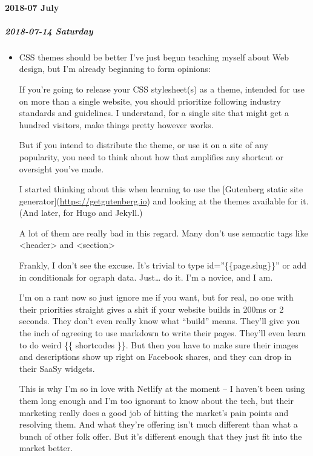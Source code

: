 \documentclass[11pt]{article}
\begin{document}
\paragraph*{2018-07 July}
\label{sec:orgec62116}
\startcontents[level-4]
\subparagraph*{2018-07-14 Saturday}
\label{sec:orgd4bd8c6}
\begin{itemize}
\item CSS themes should be better
\label{sec:orgb2c5ca3}
I’ve just begun teaching myself about Web design, but I’m already beginning to form opinions:

If you’re going to release your CSS stylesheet(s) as a theme, intended for use on more than a single website, you should prioritize following industry standards and guidelines. I understand, for a single site that might get a hundred visitors, make things pretty however works.

But if you intend to distribute the theme, or use it on a site of any popularity, you need to think about how that amplifies any shortcut or oversight you’ve made.

I started thinking about this when learning to use the [Gutenberg static site generator](\url{https://getgutenberg.io}) and looking at the themes available for it. (And later, for Hugo and Jekyll.)

A lot of them are really bad in this regard. Many don’t use semantic tags like <header> and <section>

Frankly, I don’t see the excuse. It’s trivial to type id=”\{\{page.slug\}\}” or add in conditionals for ograph data. Just… do it. I’m a novice, and I am.

I’m on a rant now so just ignore me if you want, but for real, no one with their priorities straight gives a shit if your website builds in 200ms or 2 seconds. They don’t even really know what “build” means. They’ll give you the inch of agreeing to use markdown to write their pages. They’ll even learn to do weird \{\{ shortcodes \}\}. But then you have to make sure their images and descriptions show up right on Facebook shares, and they can drop in their SaaSy widgets.

This is why I’m so in love with Netlify at the moment – I haven’t been using them long enough and I’m too ignorant to know about the tech, but their marketing really does a good job of hitting the market’s pain points and resolving them. And what they’re offering isn’t much different than what a bunch of other folk offer. But it’s different enough that they just fit into the market better.
\end{itemize}
\stopcontents[level-4]
\stopcontents[level-3]
\end{document}
